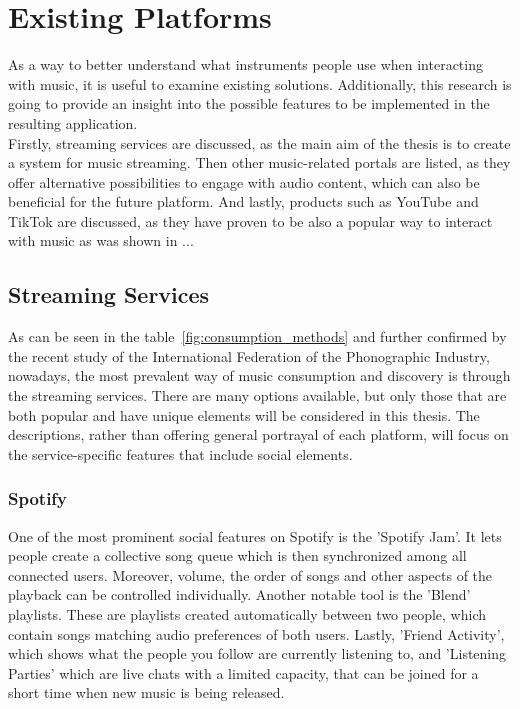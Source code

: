 \chapter{Existing Platforms}\label{chap:platforms}

As a way to better understand what instruments people use when interacting with music,
it is useful to examine existing solutions. Additionally, this research is going to provide an insight
into the possible features to be implemented in the resulting application.\\
Firstly, streaming services are discussed, as the main aim of the thesis is to create a system for music streaming.
Then other music-related portals are listed, as they offer alternative possibilities to engage with audio content, which
can also be beneficial for the future platform.
And lastly, products such as YouTube and TikTok are discussed, as they have proven to be also a popular way to interact
with music as was shown in ...


\section{Streaming Services}
As can be seen in the table~\ref{fig:consumption_methods} and further confirmed by
the recent study of the International Federation of the Phonographic Industry\cite{music_stats_2024},
nowadays, the most prevalent way of music consumption
and discovery is through the streaming services. There are many options available,
but only those that are both popular and have unique elements will be considered in this thesis.
The descriptions, rather than offering general portrayal of each platform,
will focus on the service-specific features that include social elements.

\subsection{Spotify}
One of the most prominent social features on Spotify is the 'Spotify Jam'\cite{spotify_jam}.
It lets people create a collective song queue which is then synchronized among all connected users.
Moreover, volume, the order of songs and other aspects of the playback can be controlled individually.
Another notable tool is the 'Blend' playlists\cite{spotify_recs}. These are playlists created automatically
between two people, which contain songs matching audio preferences of both users.
Lastly, 'Friend Activity'\cite{spotify_friend_activ}, which shows what the people you follow are currently listening to,
and 'Listening Parties' which are live chats with a limited capacity,
that can be joined for a short time when new music is being released\cite{spotify_party_1,spotify_party_2}.

